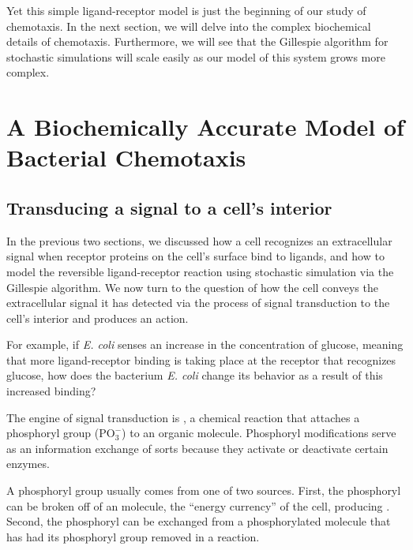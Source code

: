 Yet this simple ligand-receptor model is just the beginning of our study of chemotaxis. In the next section, we will delve into the complex biochemical details of chemotaxis. Furthermore, we will see that the Gillespie algorithm for stochastic simulations will scale easily as our model of this system grows more complex.

\FloatBarrier
{}

\section{A Biochemically Accurate Model of Bacterial Chemotaxis}
\label{sec:a_biochemically_accurate_model_of_bacterial_chemotaxis}

\subsection{Transducing a signal to a cell's interior}

In the previous two sections, we discussed how a cell recognizes an extracellular signal when receptor proteins on the cell's surface bind to ligands, and how to model the reversible ligand-receptor reaction using stochastic simulation via the Gillespie algorithm. We now turn to the question of how the cell conveys the extracellular signal it has detected via the process of signal transduction to the cell's interior and produces an action.

For example, if \textit{E. coli} senses an increase in the concentration of glucose, meaning that more ligand-receptor binding is taking place at the receptor that recognizes glucose, how does the bacterium \textit{E. coli} change its behavior as a result of this increased binding?

The engine of signal transduction is , a chemical reaction that attaches a phosphoryl group ($\text{PO}_3^{-}$) to an organic molecule.  Phosphoryl modifications serve as an information exchange of sorts because they activate or deactivate certain enzymes.

A phosphoryl group usually comes from one of two sources. First, the phosphoryl can be broken off of an  molecule, the ``energy currency'' of the cell, producing . Second, the phosphoryl can be exchanged from a phosphorylated molecule that has had its phosphoryl group removed in a  reaction.

